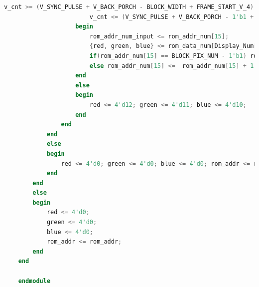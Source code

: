 \documentclass[UTF8]{article}
\begin{document}
\begin{lstlisting}[language=Verilog]
						v_cnt >= (V_SYNC_PULSE + V_BACK_PORCH - BLOCK_WIDTH + FRAME_START_V_4) &&
						v_cnt <= (V_SYNC_PULSE + V_BACK_PORCH - 1'b1 + FRAME_START_V_4))
					begin
						rom_addr_num_input <= rom_addr_num[15];
						{red, green, blue} <= rom_data_num[Display_Num[63:60]];
						if(rom_addr_num[15] == BLOCK_PIX_NUM - 1'b1) rom_addr_num[15] <=  13'd0;
						else rom_addr_num[15] <=  rom_addr_num[15] + 1'b1;
					end
					else
					begin
						red <= 4'd12; green <= 4'd11; blue <= 4'd10;
					end
				end
			end
			else
			begin
				red <= 4'd0; green <= 4'd0; blue <= 4'd0; rom_addr <= rom_addr;
			end
		end  
		else
		begin
			red <= 4'd0;
			green <= 4'd0;
			blue <= 4'd0;
			rom_addr <= rom_addr;
		end           
	end
	
	endmodule
	\end{lstlisting}
	
\end{document}
